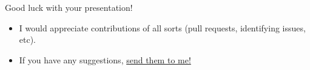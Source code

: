 \documentclass[]{beamer}
\newcommand{\hrefcol}[2]{\textcolor{uihteal}{\href{#1}{#2}}}
\begin{document}
\begin{frame}[fragile]{Good luck with your presentation!}
\begin{itemize}
\item  I would appreciate contributions of all sorts (pull requests, identifying issues, etc).
\item  If you have any suggestions\cite{sample2021},
\hrefcol{mailto:hr.tan@connect.ust.hk}{send them to me!}
\end{itemize}
\end{frame}

\backmatter
\end{document}
